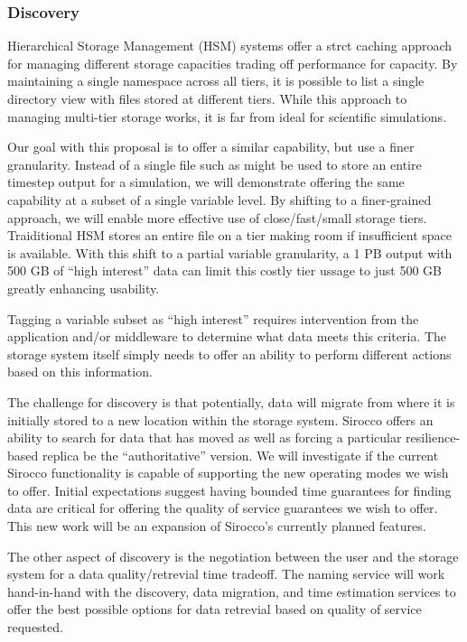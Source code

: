 \subsubsection{Discovery}

%
%

Hierarchical Storage Management (HSM) systems offer a strct caching approach
for managing different storage capacities trading off performance for capacity.
By maintaining a single namespace across all tiers, it is possible to list a
single directory view with files stored at different tiers. While this approach
to managing multi-tier storage works, it is far from ideal for scientific
simulations.

Our goal with this proposal is to offer a similar capability, but use a finer
granularity. Instead of a single file such as might be used to store an entire
timestep output for a simulation, we will demonstrate offering the same
capability at a subset of a single variable level. By shifting to a
finer-grained approach, we will enable more effective use of close/fast/small
storage tiers. Traiditional HSM stores an entire file on a tier making room if
insufficient space is available. With this shift to a partial variable
granularity, a 1 PB output with 500 GB of ``high interest'' data can limit this
costly tier ussage to just 500 GB greatly enhancing usability.

Tagging a variable subset as ``high interest'' requires intervention from the
application and/or middleware to determine what data meets this criteria. The
storage system itself simply needs to offer an ability to perform different
actions based on this information.

The challenge for discovery is that potentially, data will migrate from where
it is initially stored to a new location within the storage system. Sirocco
offers an ability to search for data that has moved as well as forcing a
particular resilience-based replica be the ``authoritative'' version. We will
investigate if the current Sirocco functionality is capable of supporting the
new operating modes we wish to offer. Initial expectations suggest having
bounded time guarantees for finding data are critical for offering the quality
of service guarantees we wish to offer. This new work will be an expansion of
Sirocco's currently planned features.

The other aspect of discovery is the negotiation between the user and the
storage system for a data quality/retrevial time tradeoff. The naming service
will work hand-in-hand with the discovery, data migration, and time estimation
services to offer the best possible options for data retrevial based on quality
of service requested.
